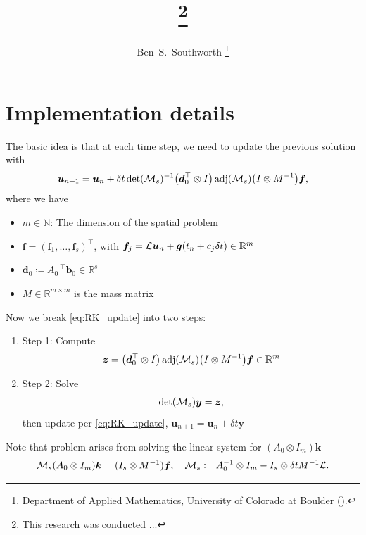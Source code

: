 \documentclass[review]{siamart}
\title{{\TheTitle}\thanks{This research was conducted ...
  }}
\author{%
  Ben~S.~Southworth
  \thanks{Department of Applied Mathematics,
          University of Colorado at Boulder
          (\email{ben.s.southworth@gmail.com}).}
}
\newcommand{\mdet}{\operatorname{det}}
\newcommand{\madj}{\operatorname{adj}}
\begin{document}
\allowdisplaybreaks



\section{Implementation details}

The basic idea is that at each time step, we need to update the previous solution with
\begin{align} \label{eq:RK_update}
\bm{u}_{n+1}  = \bm{u}_n + \delta t \mdet({\cal M}_s)^{-1} \big( \bm{d}^\top_0 \otimes I \big) \madj({\cal M}_s) \big( I \otimes M^{-1} \big) \bm{f},
\end{align}
where we have
\begin{itemize}
\item $m \in \mathbb{N}$: The dimension of the spatial problem

\item $\bm{f} = (\bm{f}_1, \ldots, \bm{f}_s)^\top$, with $\bm{f}_j = {\cal L} \bm{u}_n + \bm{g}(t_n + c_j \delta t) \in \mathbb{R}^m$

\item $\bm{d}_0 \coloneqq A^{-\top}_0 \bm{b}_0 \in \mathbb{R}^{s}$ 

\item $M \in \mathbb{R}^{m \times m}$ is the mass matrix
\end{itemize}

Now we break \eqref{eq:RK_update} into two steps:
\begin{enumerate}
\item{Step 1:}\label{it:update_step1} Compute 
\begin{align} \label{eq:step1}
\bm{z} = \big( \bm{d}^\top_0 \otimes I \big) \madj ({\cal M}_s) \big(I \otimes M^{-1} \big)\bm{f} \in \mathbb{R}^m
\end{align}

\item{Step 2:}\label{it:update_step2} Solve
\begin{align} \label{eq:step2}
\mdet( {\cal M}_s ) \bm{y} = \bm{z},
\end{align}
then update per \eqref{eq:RK_update}, $\bm{u}_{n+1} = \bm{u}_n + \delta t \bm{y}$
\end{enumerate}

Note that problem arises from solving the linear system for $(A_0 \otimes I_m) \bm{k}$
\begin{align}
{\cal M}_s (A_0 \otimes I_m) \bm{k} = (I_s \otimes M^{-1}) \bm{f}, 
\quad 
{\cal M}_s \coloneqq A_0^{-1} \otimes I_m - I_s \otimes \delta t M^{-1} {\cal L}.
\end{align}
\end{document}
